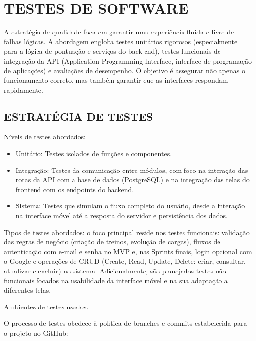\clearpage
\section{TESTES DE SOFTWARE}

A estratégia de qualidade foca em garantir uma experiência fluida e livre de falhas lógicas. A abordagem engloba testes unitários rigorosos (especialmente para a lógica de pontuação e serviços do back-end), testes funcionais de integração da API (Application Programming Interface, interface de programação de aplicações) e avaliações de desempenho. O objetivo é assegurar não apenas o funcionamento correto, mas também garantir que as interfaces respondam rapidamente.

\subsection{ESTRATÉGIA DE TESTES}

Níveis de testes abordados:

\begin{itemize}
\item Unitário: Testes isolados de funções e componentes.

\item Integração: Testes da comunicação entre módulos, com foco na interação das rotas da API com a base de dados (PostgreSQL) e na integração das telas do frontend com os endpoints do backend.

\item Sistema: Testes que simulam o fluxo completo do usuário, desde a interação na interface móvel até a resposta do servidor e persistência dos dados.

\end{itemize}

Tipos de testes abordados: o foco principal reside nos testes funcionais: validação das regras de negócio (criação de treinos, evolução de cargas), fluxos de autenticação com e-mail e senha no MVP e, nas Sprints finais, login opcional com o Google e operações de CRUD (Create, Read, Update, Delete: criar, consultar, atualizar e excluir) no sistema. Adicionalmente, são planejados testes não funcionais focados na usabilidade da interface móvel e na sua adaptação a diferentes telas.

Ambientes de testes usados:

O processo de testes obedece à política de branches e commits estabelecida para o projeto no GitHub:

